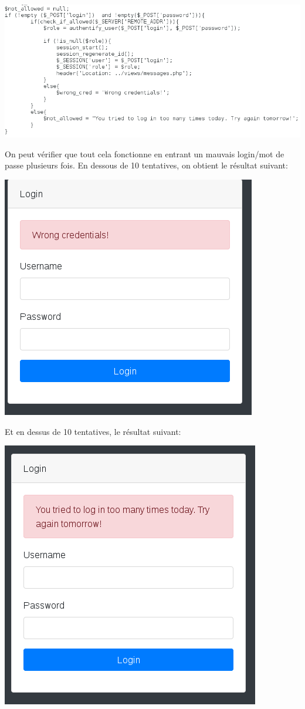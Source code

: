 \documentclass{article}
\begin{document}
\includegraphics{images/tentative_login.PNG}

On peut vérifier que tout cela fonctionne en entrant un mauvais
login/mot de passe plusieurs fois. En dessous de 10 tentatives, on
obtient le résultat suivant:

\includegraphics{images/tentative_moins_10.PNG}

Et en dessus de 10 tentatives, le résultat suivant:

\includegraphics{images/tentative_plus_10.PNG}
\end{document}

